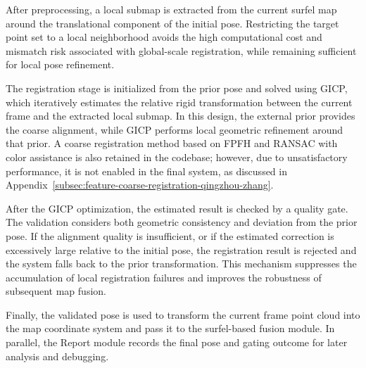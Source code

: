 \documentclass[12pt]{interim_report}
\begin{document}
After preprocessing, a local submap is extracted from the current surfel map around the translational component of the initial pose. Restricting the target point set to a local neighborhood avoids the high computational cost and mismatch risk associated with global-scale registration, while remaining sufficient for local pose refinement.

The registration stage is initialized from the prior pose and solved using GICP, which iteratively estimates the relative rigid transformation between the current frame and the extracted local submap. In this design, the external prior provides the coarse alignment, while GICP performs local geometric refinement around that prior. A coarse registration method based on FPFH and RANSAC with color assistance is also retained in the codebase; however, due to unsatisfactory performance, it is not enabled in the final system, as discussed in Appendix~\ref{subsec:feature-coarse-registration-qingzhou-zhang}.

After the GICP optimization, the estimated result is checked by a quality gate. The validation considers both geometric consistency and deviation from the prior pose. If the alignment quality is insufficient, or if the estimated correction is excessively large relative to the initial pose, the registration result is rejected and the system falls back to the prior transformation. This mechanism suppresses the accumulation of local registration failures and improves the robustness of subsequent map fusion.

Finally, the validated pose is used to transform the current frame point cloud into the map coordinate system and pass it to the surfel-based fusion module. In parallel, the Report module records the final pose and gating outcome for later analysis and debugging.
\end{document}
